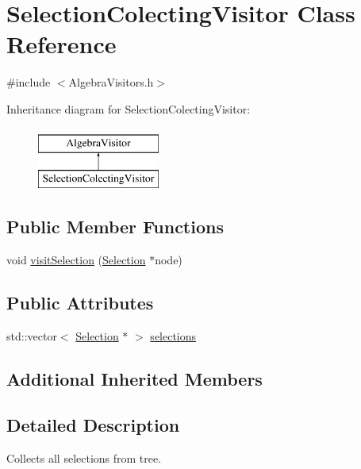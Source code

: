 \hypertarget{class_selection_colecting_visitor}{\section{Selection\+Colecting\+Visitor Class Reference}
\label{class_selection_colecting_visitor}
}


{\ttfamily \#include $<$Algebra\+Visitors.\+h$>$}

Inheritance diagram for Selection\+Colecting\+Visitor\+:\begin{figure}[H]
\begin{center}
\leavevmode
\includegraphics[height=2.000000cm]{class_selection_colecting_visitor}
\end{center}
\end{figure}
\subsection*{Public Member Functions}
\begin{DoxyCompactItemize}
\item 
void \hyperlink{class_selection_colecting_visitor_a29c5a9ecf7dbfdc4b563b94385c61de3}{visit\+Selection} (\hyperlink{class_selection}{Selection} $\ast$node)
\end{DoxyCompactItemize}
\subsection*{Public Attributes}
\begin{DoxyCompactItemize}
\item 
std\+::vector$<$ \hyperlink{class_selection}{Selection} $\ast$ $>$ \hyperlink{class_selection_colecting_visitor_a6323b360276b0ff23f5dcaa19b2317eb}{selections}
\end{DoxyCompactItemize}
\subsection*{Additional Inherited Members}


\subsection{Detailed Description}
Collects all selections from tree. 


